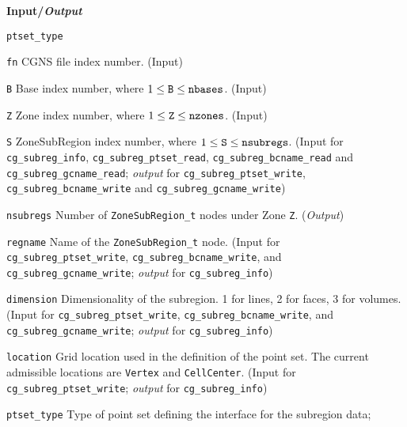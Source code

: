 \noindent
\textbf{\textcolor{input}{Input}/\textcolor{output}{\textit{Output}}}

\begin{Ventryi}{\texttt{ptset\_type}}\raggedright
\item [\texttt{fn}]
      CGNS file index number.
      (\textcolor{input}{Input})
\item [\texttt{B}]
      Base index number, where $1 \leq \text{\texttt{B}} \leq \text{\texttt{nbases}}$.
      (\textcolor{input}{Input})
\item [\texttt{Z}]
      Zone index number, where $1 \leq \text{\texttt{Z}} \leq \text{\texttt{nzones}}$.
      (\textcolor{input}{Input})
\item [\texttt{S}]
      ZoneSubRegion index number, where $1 \leq \text{\texttt{S}} \leq \text{\texttt{nsubregs}}$.
      (\textcolor{input}{Input} for \texttt{cg\_subreg\_info},
      \texttt{cg\_subreg\_ptset\_read}, \texttt{cg\_subreg\_bcname\_read} and
      \texttt{cg\_subreg\_gcname\_read};
      \textcolor{output}{\textit{output}} for \texttt{cg\_subreg\_ptset\_write},
      \texttt{cg\_subreg\_bcname\_write} and \texttt{cg\_subreg\_gcname\_write})
\item [\texttt{nsubregs}]
      Number of \texttt{ZoneSubRegion\_t} nodes under Zone \texttt{Z}.
      (\textcolor{output}{\textit{Output}})
\item [\texttt{regname}]
      Name of the \texttt{ZoneSubRegion\_t} node.
      (\textcolor{input}{Input} for \texttt{cg\_subreg\_ptset\_write},
      \texttt{cg\_subreg\_bcname\_write}, and
      \texttt{cg\_subreg\_gcname\_write};
      \textcolor{output}{\textit{output}} for \texttt{cg\_subreg\_info})
\item [\texttt{dimension}]
      Dimensionality of the subregion. 1 for lines, 2 for faces,
      3 for volumes.
      (\textcolor{input}{Input} for \texttt{cg\_subreg\_ptset\_write},
      \texttt{cg\_subreg\_bcname\_write}, and
      \texttt{cg\_subreg\_gcname\_write};
      \textcolor{output}{\textit{output}} for \texttt{cg\_subreg\_info})
\item [\texttt{location}]
      Grid location used in the definition of the point set.
      The current admissible locations are \texttt{Vertex} and
      \texttt{CellCenter}.
      (\textcolor{input}{Input} for \texttt{cg\_subreg\_ptset\_write};
      \textcolor{output}{\textit{output}} for \texttt{cg\_subreg\_info})
\item [\texttt{ptset\_type}]
      Type of point set defining the interface for the subregion data;

\end{Ventryi}
